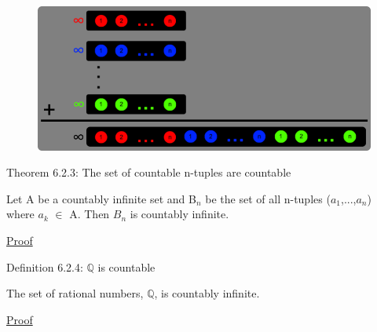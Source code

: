 \begin{figure}[h]
	\centering
	\includegraphics[scale=0.32]{Images/6.2.2.png}
\end{figure}

\newpage

{ \color{red} Theorem 6.2.3: The set of countable n-tuples are countable } 

	\begin{adjustbox}{minipage=14cm, right, vspace=0.1cm 0cm}
		Let A be a countably infinite set and B$_n$ be the set of all
		n-tuples ($a_1$,...,$a_n$) where $a_k$ $\in$ A.
		Then $B_n$ is countably infinite.
	\end{adjustbox}

{ \color{magenta} \underline{Proof} }

	
	 \vspace{0.5cm}

{ \color{blue} Definition 6.2.4: $\mathbb{Q}$ is countable } 

	\begin{adjustbox}{minipage=14cm, right, vspace=0.1cm 0cm}
		The set of rational numbers, $\mathbb{Q}$, is countably infinite.
	\end{adjustbox}

{ \color{magenta} \underline{Proof} }

